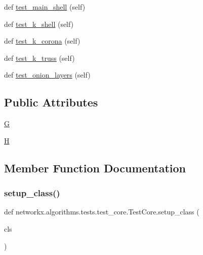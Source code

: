 \begin{DoxyCompactItemize}
\item 
def \hyperlink{classnetworkx_1_1algorithms_1_1tests_1_1test__core_1_1TestCore_a080bbc2e2a07dcfbad87db75a52d1760}{test\+\_\+main\+\_\+shell} (self)
\item 
def \hyperlink{classnetworkx_1_1algorithms_1_1tests_1_1test__core_1_1TestCore_a76e484bafc6d0233d21145ec841782f7}{test\+\_\+k\+\_\+shell} (self)
\item 
def \hyperlink{classnetworkx_1_1algorithms_1_1tests_1_1test__core_1_1TestCore_a5d51bd2fb44434b6adf5321578ad2f91}{test\+\_\+k\+\_\+corona} (self)
\item 
def \hyperlink{classnetworkx_1_1algorithms_1_1tests_1_1test__core_1_1TestCore_ad0c1d80cf4a0b62657ce08f66b058e64}{test\+\_\+k\+\_\+truss} (self)
\item 
def \hyperlink{classnetworkx_1_1algorithms_1_1tests_1_1test__core_1_1TestCore_a3ce3eec8d7e9481fe25eae78bb3328dd}{test\+\_\+onion\+\_\+layers} (self)
\end{DoxyCompactItemize}
\subsection*{Public Attributes}
\begin{DoxyCompactItemize}
\item 
\hyperlink{classnetworkx_1_1algorithms_1_1tests_1_1test__core_1_1TestCore_aba5835c084f54636b73b758f8c5b3f20}{G}
\item 
\hyperlink{classnetworkx_1_1algorithms_1_1tests_1_1test__core_1_1TestCore_a52aa0f5bb6a4babb7190a2020bd9d2a1}{H}
\end{DoxyCompactItemize}


\subsection{Member Function Documentation}
\mbox{\label{classnetworkx_1_1algorithms_1_1tests_1_1test__core_1_1TestCore_a9711bce44e66a7c50eb874622a6d1328}} 
\subsubsection{\texorpdfstring{setup\+\_\+class()}{setup\_class()}}
{\footnotesize\ttfamily def networkx.\+algorithms.\+tests.\+test\+\_\+core.\+Test\+Core.\+setup\+\_\+class (\begin{DoxyParamCaption}\item[{}]{cls }\end{DoxyParamCaption})}

